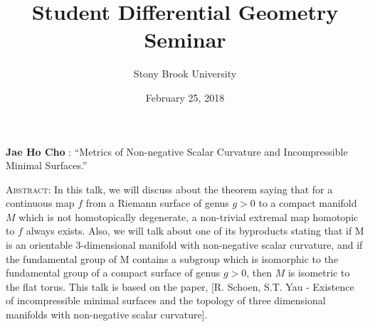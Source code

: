 \documentclass[11pt]{article}
\title{Student Differential Geometry Seminar}
\author{Stony Brook University}
\date{February 25, 2018}
\makeatletter
\newcommand{\spe@ker}{}
\newcommand{\t@lktitle}{}
\newcommand{\@ffili@tion}{}
\newcommand{\speaker}[1]{%
  \renewcommand{\spe@ker}{#1}}
\newcommand{\talktitle}[1]{%
  \renewcommand{\t@lktitle}{#1}}
\newcommand{\affiliation}[1]{%
  \renewcommand{\@ffili@tion}{#1}}
\renewenvironment{abstract}{%
  \begin{center}
    \large
    \textbf{\spe@ker} %
    : ``\t@lktitle''
  \end{center}
  \begin{trivlist}
  \item\textsc{Abstract:}}{%
  \end{trivlist}}
\makeatother
\begin{document}
\maketitle
\thispagestyle{empty}

\speaker{Jae Ho Cho}
\talktitle{Metrics of Non-negative Scalar Curvature and Incompressible Minimal Surfaces.}

\begin{abstract}
In this talk, we will discuss about the theorem saying that for a continuous map $f$ from a Riemann surface of genus $g>0$ to a compact manifold $M$ which is not homotopically degenerate, a non-trivial extremal map homotopic to $f$ always exists. Also, we will talk about one of its byproducts stating that if M is an orientable 3-dimensional manifold with non-negative scalar curvature, and if the fundamental group of M contains a subgroup which is isomorphic to the fundamental group of a compact surface of genus $g>0$, then $M$ is isometric to the flat torus. This talk is based on the paper, [R. Schoen, S.T. Yau - Existence of incompressible minimal surfaces and the topology of three dimensional manifolds with non-negative scalar curvature].
\end{abstract}
\end{document}
